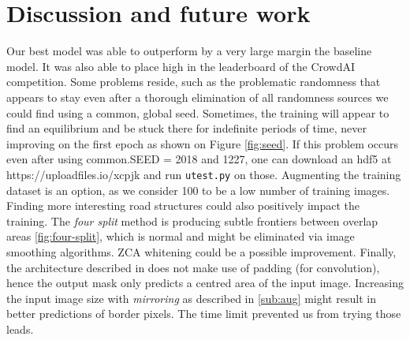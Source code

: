 \documentclass[10pt,conference,compsocconf]{IEEEtran}
\begin{document}
\section{Discussion and future work}
Our best model was able to outperform by a very large margin the baseline model. It was also able to place high in the leaderboard of the CrowdAI competition. Some problems reside, such as the problematic randomness that appears to stay even after a thorough elimination of all randomness sources we could find using a common, global seed. Sometimes, the training will appear to find an equilibrium and be stuck there for indefinite periods of time, never improving on the first epoch as shown on Figure \ref{fig:seed}. If this problem occurs even after using common.SEED = 2018 and 1227, one can download an hdf5 at https://uploadfiles.io/xcpjk and run \verb|utest.py| on those. Augmenting the training dataset is an option, as we consider 100 to be a low number of training images. Finding more interesting road structures could also positively impact the training. The \textit{four split} method is producing subtle frontiers between overlap areas \ref{fig:four-split}, which is normal and might be eliminated via image smoothing algorithms. ZCA whitening could be a possible improvement. Finally, the architecture described in \cite{DBLP:journals/corr/RonnebergerFB15} does not make use of padding (for convolution), hence the output mask only predicts a centred area of the input image. Increasing the input image size with \textit{mirroring} as described in \ref{sub:aug} might result in better predictions of border pixels. The time limit prevented us from trying those leads.

{}

\end{document}
